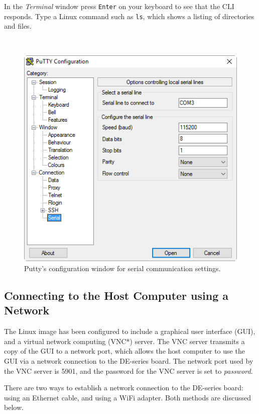 \documentclass[11pt, twoside, pdftex]{article}
\begin{document}
In the {\it Terminal} window press \texttt{Enter} on your keyboard to see that the CLI responds. 
Type a Linux command such as \texttt{ls}, which shows a listing of directories and files. 

~\\
\begin{figure}[H]
   \begin{center}
       \includegraphics[scale=0.8]{figures/fig_putty_tut_2}
   \end{center}
   \caption{Putty's configuration window for serial communication settings.}
	\label{fig:putty_2}
\end{figure}

\subsection{Connecting to the Host Computer using a Network}
\label{sec:conn_network}

The Linux image has been configured to include a graphical user interface
(GUI), and a virtual network computing (VNC*) server. The VNC server transmits a copy of
the GUI to a network port, which allows the host computer to use the GUI via a network 
connection to the DE-series board. The network port used by the VNC server is 5901, and the
password for the VNC server is set to {\it password}.

There are two ways to establish a network connection to the DE-series board: using an
Ethernet cable, and using a WiFi adapter. Both methods are discussed below.
\end{document}
